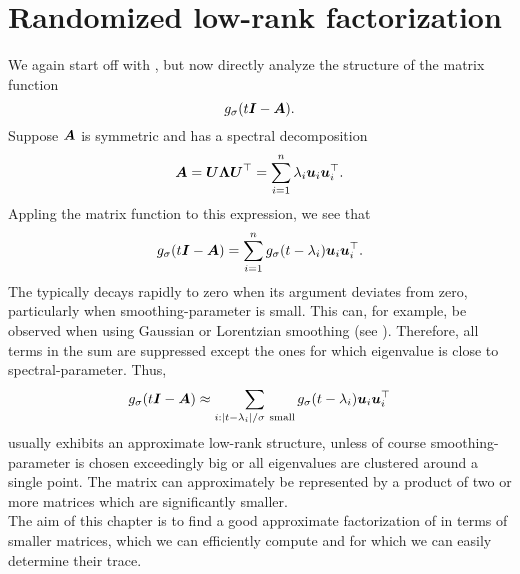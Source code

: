 \chapter{Randomized low-rank factorization}
\label{chp:3-nystrom}

We again start off with , but now
directly analyze the structure of the matrix function
\begin{equation}
    g_{\sigma}(t\boldsymbol{I} - \boldsymbol{A}).
    \label{equ:3-nystrom-matrix-function}
\end{equation}
Suppose $\boldsymbol{A}$ is symmetric and has a spectral decomposition
\begin{equation}
    \boldsymbol{A}
        = \boldsymbol{U} \boldsymbol{\Lambda} \boldsymbol{U}^{\top} 
        = \sum_{i=1}^n \lambda_i \boldsymbol{u}_i \boldsymbol{u}_i^{\top}.
    \label{equ:3-nystrom-matrix-spectral-decomposition}
\end{equation}
Appling the matrix function to this expression, we see that
\begin{equation}
    g_{\sigma}(t\boldsymbol{I} - \boldsymbol{A})
        = \sum_{i=1}^n g_{\sigma}(t - \lambda_i) \boldsymbol{u}_i \boldsymbol{u}_i^{\top}.
    \label{equ:3-nystrom-matrix-function-spectral-decomposition}
\end{equation}
The  typically decays
rapidly to zero when its argument deviates from zero, particularly when
\gls{smoothing-parameter} is small. This can, for example, be observed when using Gaussian
or Lorentzian smoothing (see ).
Therefore, all terms in the sum 
are suppressed except the ones for which \gls{eigenvalue} is close to \gls{spectral-parameter}.
Thus,
\begin{equation}
    g_{\sigma}(t\boldsymbol{I} - \boldsymbol{A})
        \approx \sum_{i: |t - \lambda_i|/\sigma~\text{small}} g_{\sigma}(t - \lambda_i) \boldsymbol{u}_i \boldsymbol{u}_i^{\top}
    \label{equ:3-nystrom-matrix-function-low-rank-approximation}
\end{equation}
usually exhibits an approximate low-rank structure, unless of course \gls{smoothing-parameter} is chosen exceedingly big or all eigenvalues
are clustered around a single point. The matrix can approximately 
be represented by a product of two or more matrices which are significantly smaller.\\

The aim of this chapter is to find a good approximate factorization of 
in terms of smaller matrices, which we can efficiently compute and for which we can
easily determine their trace.

